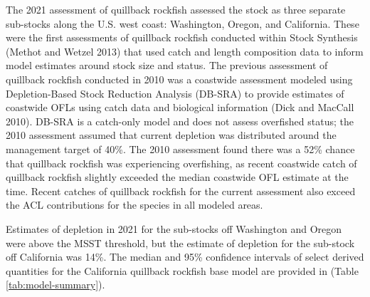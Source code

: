 \documentclass[11pt,
  english,
  a4paper,
]{article}
\begin{document}
The 2021 assessment of quillback rockfish assessed the stock as three separate sub-stocks along the U.S. west coast: Washington, Oregon, and California. These were the first assessments of quillback rockfish conducted within Stock Synthesis {(Methot and Wetzel 2013)\leavevmode\tagmcend\tagstructend} that used catch and length composition data to inform model estimates around stock size and status. The previous assessment of quillback rockfish conducted in 2010 was a coastwide assessment modeled using Depletion-Based Stock Reduction Analysis (DB-SRA) to provide estimates of coastwide OFLs using catch data and biological information {(Dick and MacCall 2010)\leavevmode\tagmcend\tagstructend}. DB-SRA is a catch-only model and does not assess overfished status; the 2010 assessment assumed that current depletion was distributed around the management target of 40\%. The 2010 assessment found there was a 52\% chance that quillback rockfish was experiencing overfishing, as recent coastwide catch of quillback rockfish slightly exceeded the median coastwide OFL estimate at the time. Recent catches of quillback rockfish for the current assessment also exceed the ACL contributions for the species in all modeled areas.

\leavevmode\tagmcend\tagstructend\par


Estimates of depletion in 2021 for the sub-stocks off Washington and Oregon were above the MSST threshold, but the estimate of depletion for the sub-stock off California was 14\%. The median and 95\% confidence intervals of select derived quantities for the California quillback rockfish base model are provided in (Table \ref{tab:model-summary}).

\leavevmode\tagmcend\tagstructend\par

\end{document}
